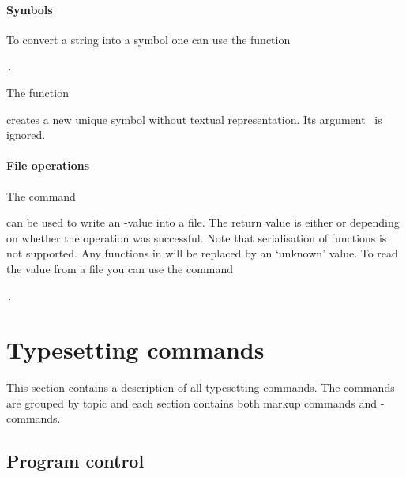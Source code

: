 \paragraph{Symbols}
To convert a string into a symbol one can use the function
\begin{display}
   \,.
\end{display}
The function
\begin{display}
   
\end{display}
creates a new unique symbol without textual representation. Its argument~ is ignored.

\paragraph{File operations}
The command
\begin{display}
    
\end{display}
can be used to write an \AL-value into a file. The return value is either 
or  depending on whether the operation was successful.
Note that serialisation of functions
is not supported. Any functions in  will be replaced by an `unknown' value.
To read the value from a file you can use the command
\begin{display}
   \,.
\end{display}


\section{Typesetting commands}   %


This section contains a description of all typesetting commands. The commands are grouped by topic
and each section contains both markup commands and \AL-commands.


\subsection{Program control}   %



